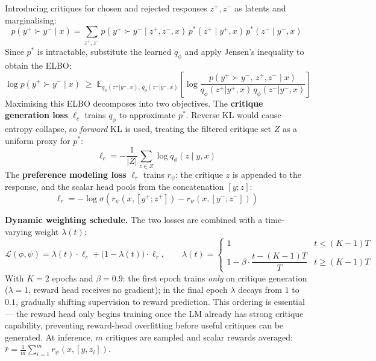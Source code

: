 Introducing critiques for chosen and rejected responses $z^+, z^-$ as latents and marginalising:
$$p(y^+ \succ y^- \mid x) = \sum_{z^+, z^-} p(y^+ \succ y^- \mid z^+, z^-, x)\, p^*(z^+ \mid y^+, x)\, p^*(z^- \mid y^-, x)$$
Since $p^*$ is intractable, substitute the learned $q_\phi$ and apply Jensen's inequality to obtain the ELBO:
\begin{equation}
    \log p(y^+ \succ y^- \mid x) \;\geq\; \mathbb{E}_{q_\phi(z^+|y^+,x),\,q_\phi(z^-|y^-,x)}\!\left[\log \frac{p(y^+ \succ y^-,\, z^+, z^- \mid x)}{q_\phi(z^+|y^+,x)\,q_\phi(z^-|y^-,x)}\right]
    \label{eq:critic_rm}
\end{equation}
Maximising this ELBO decomposes into two objectives. The \textbf{critique generation loss} $\ell_c$ trains $q_\phi$ to approximate $p^*$. Reverse KL would cause entropy collapse, so \emph{forward} KL is used, treating the filtered critique set $Z$ as a uniform proxy for $p^*$:
\begin{equation}
    \ell_c = -\frac{1}{|Z|}\sum_{z \in Z} \log q_\phi(z \mid y, x)
    \label{eq:critic_rm_c}
\end{equation}
The \textbf{preference modeling loss} $\ell_r$ trains $r_\psi$: the critique $z$ is appended to the response, and the scalar head pools from the concatenation $[y; z]$:
\begin{equation}
    \ell_r = -\log\sigma\!\left(r_\psi(x, [y^+; z^+]) - r_\psi(x, [y^-; z^-])\right)
    \label{eq:critic_rm_r}
\end{equation}

\textbf{Dynamic weighting schedule.} The two losses are combined with a time-varying weight $\lambda(t)$:
\begin{equation}
    \mathcal{L}(\phi, \psi) = \lambda(t)\cdot\ell_c + \bigl(1-\lambda(t)\bigr)\cdot\ell_r, \qquad
    \lambda(t) = \begin{cases} 1 & t < (K-1)T \\ 1 - \beta\cdot\dfrac{t-(K-1)T}{T} & t \geq (K-1)T \end{cases}
    \label{eq:critic_rm_schedule}
\end{equation}
With $K=2$ epochs and $\beta=0.9$: the first epoch trains \emph{only} on critique generation ($\lambda=1$, reward head receives no gradient); in the final epoch $\lambda$ decays from $1$ to $0.1$, gradually shifting supervision to reward prediction. This ordering is essential --- the reward head only begins training once the LM already has strong critique capability, preventing reward-head overfitting before useful critiques can be generated. At inference, $m$ critiques are sampled and scalar rewards averaged: $\bar{r} = \frac{1}{m}\sum_{i=1}^m r_\psi(x, [y, z_i])$.

